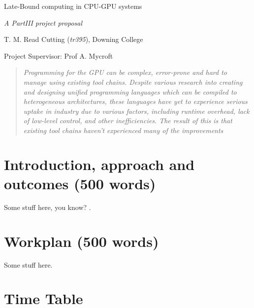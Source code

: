 \documentclass[11pt]{article}
\begin{document}
\centerline{\Large Late-Bound computing in CPU-GPU systems}
\vspace{2em}
\centerline{\Large \emph{A PartIII project proposal}}
\vspace{2em}
\centerline{\large T. M. Read Cutting (\emph{tr395}), Downing College}
\vspace{1em}
\centerline{\large Project Supervisor: Prof A. Mycroft}
\vspace{1em}

\begin{abstract}

\textsl{Programming for the GPU can be complex, error-prone and hard to manage
using existing tool chains. Despite various research into creating and designing
unified programming languages which can be compiled to heterogeneous
architectures, these languages have yet to experience serious uptake in
industry due to various factors, including runtime overhead, lack of low-level
control, and other inefficiencies. The result of this is that existing
tool chains haven't experienced many of the improvements }

\end{abstract}

\section{Introduction, approach and outcomes (500 words)}

Some stuff here, you know? \cite{Theano2016}.

\section{Workplan (500 words)}

Some stuff here.




\newpage
\appendix

\section{Time Table}
\end{document}
